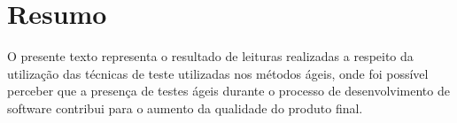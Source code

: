 \chapter*{Resumo}

O presente texto representa o resultado de leituras realizadas a respeito da utilização das técnicas de teste utilizadas nos métodos ágeis, onde foi possível perceber que a presença de testes ágeis durante o processo de desenvolvimento de software contribui para o aumento da qualidade do produto final. 
